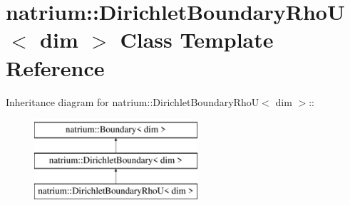 \hypertarget{classnatrium_1_1DirichletBoundaryRhoU}{
\section{natrium::DirichletBoundaryRhoU$<$ dim $>$ Class Template Reference}
\label{classnatrium_1_1DirichletBoundaryRhoU}
}
Inheritance diagram for natrium::DirichletBoundaryRhoU$<$ dim $>$::\begin{figure}[H]
\begin{center}
\leavevmode
\includegraphics[height=3cm]{classnatrium_1_1DirichletBoundaryRhoU}
\end{center}
\end{figure}
